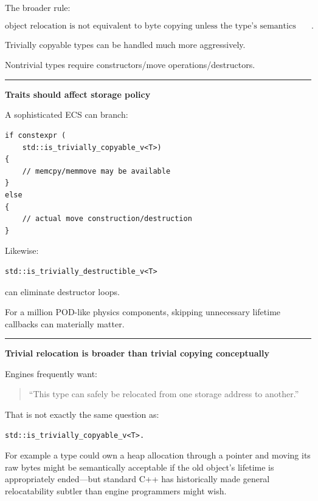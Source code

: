 The broader rule:

\[
\boxed{
\text{object relocation is not equivalent to byte copying
unless the type's semantics permit it}.
}
\]

Trivially copyable types can be handled much more aggressively.

Nontrivial types require constructors/move operations/destructors.

\begin{center}\rule{0.5\linewidth}{0.5pt}\end{center}

\textbf{Traits should affect storage policy}

A sophisticated ECS can branch:

\begin{verbatim}
if constexpr (
    std::is_trivially_copyable_v<T>)
{
    // memcpy/memmove may be available
}
else
{
    // actual move construction/destruction
}
\end{verbatim}

Likewise:

\begin{verbatim}
std::is_trivially_destructible_v<T>
\end{verbatim}

can eliminate destructor loops.

For a million POD-like physics components, skipping unnecessary lifetime callbacks can materially matter.

\begin{center}\rule{0.5\linewidth}{0.5pt}\end{center}

\textbf{Trivial relocation is broader than trivial copying conceptually}

Engines frequently want:

\begin{quote}
``This type can safely be relocated from one storage address to another.''
\end{quote}

That is not exactly the same question as:

\begin{verbatim}
std::is_trivially_copyable_v<T>.
\end{verbatim}

For example a type could own a heap allocation through a pointer and moving its raw bytes might be semantically acceptable if the old object's lifetime is appropriately ended---but standard C++ has historically made general relocatability subtler than engine programmers might wish.

